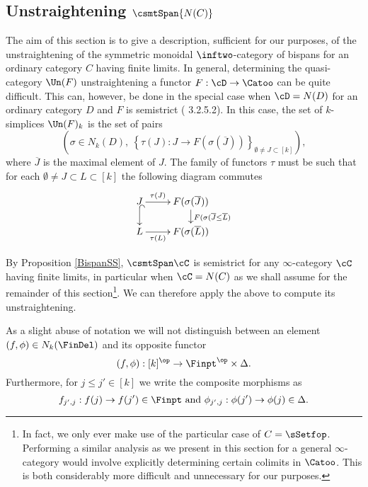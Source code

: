 \documentclass[a4paper]{article}
\numberwithin{equation}{section}
\begin{document}
\subsection{Unstraightening \texorpdfstring{$\csmtSpan {N(C)}$}{Span(N(C))}}
\label{UnstrSpan}

The aim of this section is to give a description, sufficient for our purposes, of the unstraightening of the symmetric monoidal $\inftwo$-category of bispans for an ordinary category $C$ having finite limits. In general, determining the quasi-category $\Un(F)$ unstraightening a functor $F:\cD \to \Catoo$ can be quite difficult. This can, however, be done in the special case when $\cD=N(D)$ for an ordinary category $D$ and $F$ is semistrict (\cite{HTT} 3.2.5.2). In this case, the set of $k$-simplices $\Un(F)_k$ is the set of pairs
\begin{equation}
\label{RelNerve}
 \left( \sigma \in N_k(D), \ \left\{ \tau(J): J \to F(\sigma(\overline{J}))\right\}_{\emptyset \neq J \subset [k]} \right),
\end{equation}
where $\overline{J}$ is the maximal element of $J$. The family of functors $\tau$ must be such that for each $\emptyset \neq J \subset L \subset [k]$ the following diagram commutes
\begin{equation*}
  \xymatrixrowsep{1.1pc} \xymatrix{ J \ar[r]^-{\tau(J)} \ar@{^{(}->}[d] & F(\sigma(\overline{J})) \ar[d]^{F(\sigma(\overline{J} \leq \overline{L})} \\
  L \ar[r]_-{\tau(L)} & F(\sigma(\overline{L}))}
 \end{equation*}

 
 By Proposition \ref{BispanSS}, $\csmtSpan \cC$ is semistrict for any $\infty$-category $\cC$ having finite limits, in particular when $\cC=N(C)$ as we shall assume for the remainder of this section\footnote{In fact, we only ever make use of the particular case of $C = \sSetfop$. Performing a similar analysis as we present in this section for a general $\infty$-category would involve explicitly determining certain colimits in $\Catoo$. This is both considerably more difficult and unnecessary for our purposes.}. We can therefore apply the above to compute its unstraightening.
 
  
\begin{remark}
  As a slight abuse of notation we will not distinguish between an element $(f,\phi) \in N_k(\FinDel)$ and its opposite functor
  \begin{equation*}
   (f,\phi): [k]^\op \to \Finpt^\op \times \Delta.
  \end{equation*}
Furthermore, for $j \leq j' \in [k]$ we write the composite morphisms as
\begin{equation*}
 f_{j',j}: f(j) \to f(j')\in \Finpt \ \mathrm{and} \ \phi_{j',j}: \phi(j') \to \phi(j) \in \Delta.
\end{equation*}
 \end{remark}
 
\end{document}
